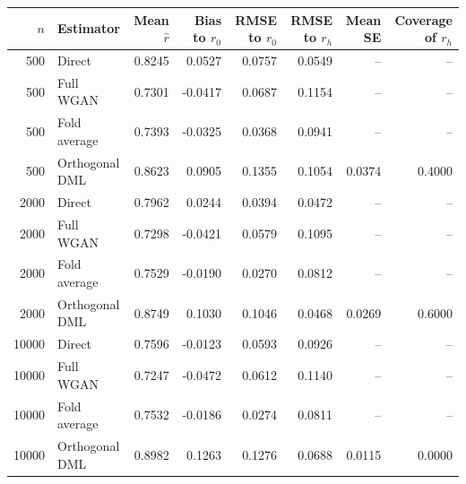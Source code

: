\begin{tabular}{rlrrrrrr}
\toprule
$n$ & Estimator & Mean $\widehat r$ & Bias to $r_0$ & RMSE to $r_0$ & RMSE to $r_h$ & Mean SE & Coverage of $r_h$ \\
\midrule
500 & Direct & 0.8245 & 0.0527 & 0.0757 & 0.0549 & -- & -- \\
500 & Full WGAN & 0.7301 & -0.0417 & 0.0687 & 0.1154 & -- & -- \\
500 & Fold average & 0.7393 & -0.0325 & 0.0368 & 0.0941 & -- & -- \\
500 & Orthogonal DML & 0.8623 & 0.0905 & 0.1355 & 0.1054 & 0.0374 & 0.4000 \\
2000 & Direct & 0.7962 & 0.0244 & 0.0394 & 0.0472 & -- & -- \\
2000 & Full WGAN & 0.7298 & -0.0421 & 0.0579 & 0.1095 & -- & -- \\
2000 & Fold average & 0.7529 & -0.0190 & 0.0270 & 0.0812 & -- & -- \\
2000 & Orthogonal DML & 0.8749 & 0.1030 & 0.1046 & 0.0468 & 0.0269 & 0.6000 \\
10000 & Direct & 0.7596 & -0.0123 & 0.0593 & 0.0926 & -- & -- \\
10000 & Full WGAN & 0.7247 & -0.0472 & 0.0612 & 0.1140 & -- & -- \\
10000 & Fold average & 0.7532 & -0.0186 & 0.0274 & 0.0811 & -- & -- \\
10000 & Orthogonal DML & 0.8982 & 0.1263 & 0.1276 & 0.0688 & 0.0115 & 0.0000 \\
\bottomrule
\end{tabular}
